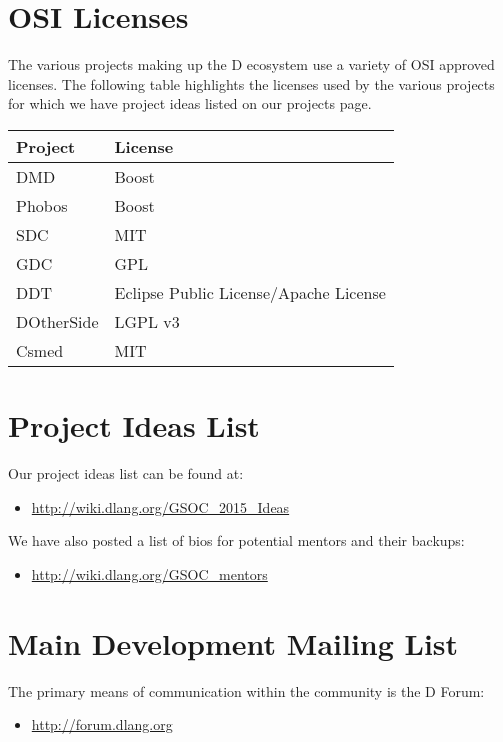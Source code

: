 \documentclass[	DIV=calc,%
							paper=a4,%
							fontsize=11pt,%
							twocolumn]{scrartcl}	 					%
\begin{document}
\section{OSI Licenses}

The various projects making up the D ecosystem use a variety of OSI approved
licenses.  The following table highlights the licenses used by the various projects
for which we have project ideas listed on our projects page.

\begin{center}
   \begin{tabular}{ | l | l | }
     \hline
     \textbf{Project} & \textbf{License} \\ \hline
     DMD & Boost \\
     Phobos & Boost \\
     SDC & MIT \\
     GDC & GPL \\
     DDT & Eclipse Public License/Apache License  \\
     DOtherSide & LGPL v3 \\
     Csmed & MIT \\ \hline
   \end{tabular}
\end{center}


\section{Project Ideas List}

Our project ideas list can be found at:
\begin{itemize}
\item \url{http://wiki.dlang.org/GSOC_2015_Ideas}
\end{itemize}

\noindent We have also posted a list of bios for potential mentors and their
backups:
\begin{itemize}
\item \url{http://wiki.dlang.org/GSOC_mentors}
\end{itemize}

\section{Main Development Mailing List}
The primary means of communication within the community is
the D Forum:
\begin{itemize}
\item \url{http://forum.dlang.org}
\end{itemize}
\end{document}

